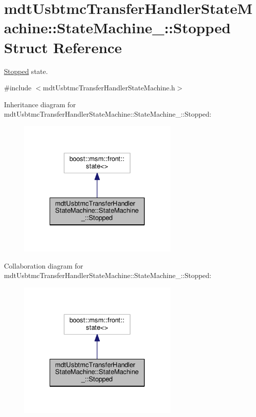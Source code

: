 \hypertarget{structmdt_usbtmc_transfer_handler_state_machine_1_1_state_machine___1_1_stopped}{\section{mdt\-Usbtmc\-Transfer\-Handler\-State\-Machine\-:\-:State\-Machine\-\_\-\-:\-:Stopped Struct Reference}
\label{structmdt_usbtmc_transfer_handler_state_machine_1_1_state_machine___1_1_stopped}
}


\hyperlink{structmdt_usbtmc_transfer_handler_state_machine_1_1_state_machine___1_1_stopped}{Stopped} state.  




{\ttfamily \#include $<$mdt\-Usbtmc\-Transfer\-Handler\-State\-Machine.\-h$>$}



Inheritance diagram for mdt\-Usbtmc\-Transfer\-Handler\-State\-Machine\-:\-:State\-Machine\-\_\-\-:\-:Stopped\-:
\nopagebreak
\begin{figure}[H]
\begin{center}
\leavevmode
\includegraphics[width=222pt]{structmdt_usbtmc_transfer_handler_state_machine_1_1_state_machine___1_1_stopped__inherit__graph}
\end{center}
\end{figure}


Collaboration diagram for mdt\-Usbtmc\-Transfer\-Handler\-State\-Machine\-:\-:State\-Machine\-\_\-\-:\-:Stopped\-:
\nopagebreak
\begin{figure}[H]
\begin{center}
\leavevmode
\includegraphics[width=222pt]{structmdt_usbtmc_transfer_handler_state_machine_1_1_state_machine___1_1_stopped__coll__graph}
\end{center}
\end{figure}
